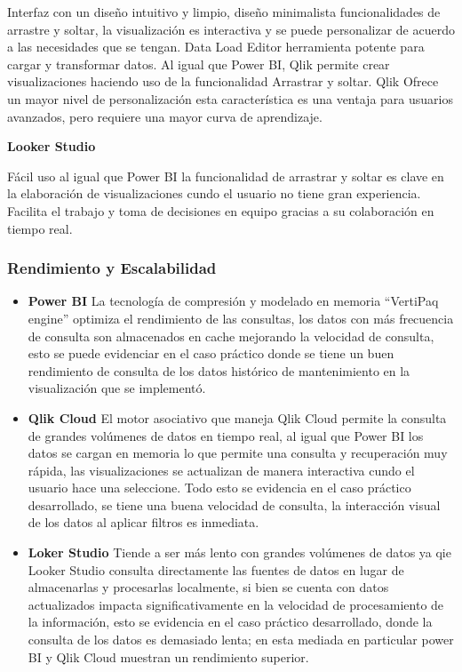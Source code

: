 \documentclass[
  11pt,
  bookmarksnumbered]{article}
\begin{document}
Interfaz con un diseño intuitivo y limpio, diseño minimalista funcionalidades de arrastre y soltar, la visualización es interactiva y se puede personalizar de acuerdo a las necesidades que se tengan.
Data Load Editor herramienta potente para cargar y transformar datos.
Al igual que Power BI, Qlik permite crear visualizaciones haciendo uso de la funcionalidad Arrastrar y soltar.
Qlik Ofrece un mayor nivel de personalización esta característica es una ventaja para usuarios avanzados, pero requiere una mayor curva de aprendizaje.

\textbf{Looker Studio}

Fácil uso al igual que Power BI la funcionalidad de arrastrar y soltar es clave en la elaboración de visualizaciones cundo el usuario no tiene gran experiencia.
Facilita el trabajo y toma de decisiones en equipo gracias a su colaboración en tiempo real.

\hypertarget{rendimiento-y-escalabilidad}{%
\subsubsection{Rendimiento y Escalabilidad}\label{rendimiento-y-escalabilidad}}

\begin{itemize}
\item
  \textbf{Power BI}
  La tecnología de compresión y modelado en memoria ``VertiPaq engine'' optimiza el rendimiento de las consultas, los datos con más frecuencia de consulta son almacenados en cache mejorando la velocidad de consulta, esto se puede evidenciar en el caso práctico donde se tiene un buen rendimiento de consulta de los datos histórico de mantenimiento en la visualización que se implementó.
\item
  \textbf{Qlik Cloud}
  El motor asociativo que maneja Qlik Cloud permite la consulta de grandes volúmenes de datos en tiempo real, al igual que Power BI los datos se cargan en memoria lo que permite una consulta y recuperación muy rápida, las visualizaciones se actualizan de manera interactiva cundo el usuario hace una seleccione. Todo esto se evidencia en el caso práctico desarrollado, se tiene una buena velocidad de consulta, la interacción visual de los datos al aplicar filtros es inmediata.
\item
  \textbf{Loker Studio}
  Tiende a ser más lento con grandes volúmenes de datos ya qie Looker Studio consulta directamente las fuentes de datos en lugar de almacenarlas y procesarlas localmente, si bien se cuenta con datos actualizados impacta significativamente en la velocidad de procesamiento de la información, esto se evidencia en el caso práctico desarrollado, donde la consulta de los datos es demasiado lenta; en esta mediada en particular power BI y Qlik Cloud muestran un rendimiento superior.
\end{itemize}
\end{document}
